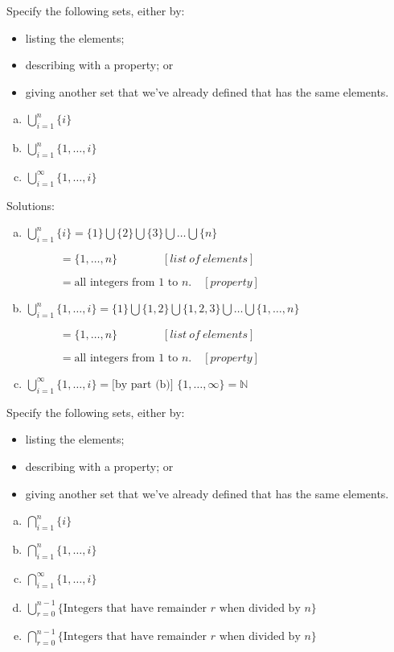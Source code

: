 \begin{example}{}
Specify the following sets, either by:
\begin{itemize}
\item
listing the elements;
\item
describing with a property; or
\item
giving another set that we've already defined that has the same elements.
\end{itemize}
\begin{enumerate}[(a)]
\item
$\bigcup_{i = 1}^{n}  \{i\}$
\item
$\bigcup_{i = 1}^{n}  \{1, \ldots, i\}$
\item
$\bigcup_{i = 1}^{\infty}  \{1, \ldots, i\}$
\end{enumerate}
\noindent
Solutions:
\begin{enumerate}[(a)]
\item
$\bigcup_{i = 1}^{n}  \{i\} = \{1\} \bigcup \{2\} \bigcup \{ 3 \} \bigcup \ldots \bigcup \{n\} $

$\qquad \quad = \{1, \ldots , n\} \qquad \qquad [list~of~elements] $

$ \qquad \quad = \text{all integers from 1 to }n. \quad [property]$
\item
$\bigcup_{i = 1}^{n}  \{1, \ldots, i\} = \{1\} \bigcup \{1, 2\} \bigcup \{1, 2, 3 \} \bigcup \ldots \bigcup \{1, \ldots , n\} $

$\qquad \quad = \{1, \ldots , n\} \qquad \qquad [list~of~elements]$

$\qquad \quad = \text{all integers from 1 to }n. \quad [property]$
\item
$\bigcup_{i = 1}^{\infty}  \{1, \ldots, i\} = \textrm{[by part (b)]   } \{1, \ldots , \infty\} = {\mathbb N}$
\end{enumerate}
\end{example} 

\begin{exercise}{14}
Specify the following sets, either by:
\begin{itemize}
\item
listing the elements;
\item
describing with a property; or
\item
giving another set that we've already defined that has the same elements.
\end{itemize}
\begin{enumerate}[(a)]
\item
$\bigcap_{i = 1}^{n}  \{i\}$
\item
$\bigcap_{i = 1}^{n}  \{1, \ldots, i\}$
\item
$\bigcap_{i = 1}^{\infty}  \{1, \ldots, i\}$
\item
$\bigcup_{r = 0}^{n-1}  \{\mbox{Integers that have remainder }r \mbox{ when divided by }n\}$
\item
$\bigcap_{r = 0}^{n-1}  \{\mbox{Integers that have remainder }r \mbox{ when divided by }n\}$
\end{enumerate}
\end{exercise}


